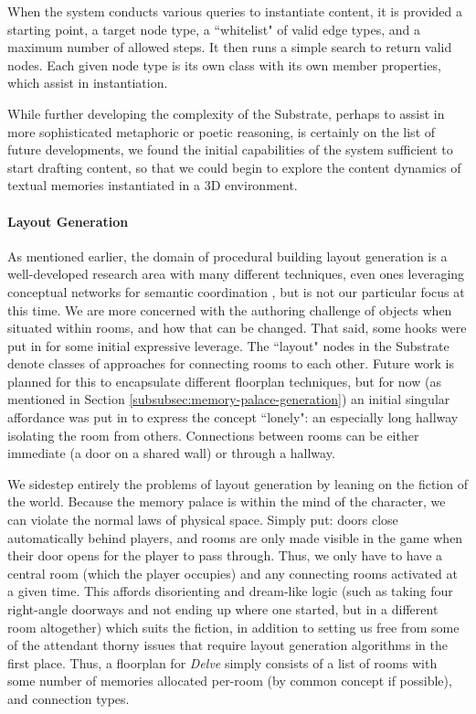 
When the system conducts various queries to instantiate content, it is provided a starting point, a target node type, a ``whitelist" of valid edge types, and a maximum number of allowed steps. It then runs a simple search to return valid nodes. Each given node type is its own class with its own member properties, which assist in instantiation.

While further developing the complexity of the Substrate, perhaps to assist in more sophisticated metaphoric or poetic reasoning, is certainly on the list of future developments, we found the initial capabilities of the system sufficient to start drafting content, so that we could begin to explore the content dynamics of textual memories instantiated in a 3D environment.

\paragraph{Layout Generation}\label{par:delve-implementation-layout-generation}

As mentioned earlier, the domain of procedural building layout generation is a well-developed research area with many different techniques, even ones leveraging conceptual networks for semantic coordination \cite{semantic_building}, but is not our particular focus at this time. We are more concerned with the authoring challenge of objects when situated within rooms, and how that can be changed. That said, some hooks were put in for some initial expressive leverage. The ``layout" nodes in the Substrate denote classes of approaches for connecting rooms to each other. Future work is planned for this to encapsulate different floorplan techniques, but for now (as mentioned in Section \ref{subsubsec:memory-palace-generation}) an initial singular affordance was put in to express the concept ``lonely": an especially long hallway isolating the room from others. Connections between rooms can be either immediate (a door on a shared wall) or through a hallway.

We sidestep entirely the problems of layout generation by leaning on the fiction of the world. Because the memory palace is within the mind of the character, we can violate the normal laws of physical space. Simply put: doors close automatically behind players, and rooms are only made visible in the game when their door opens for the player to pass through. Thus, we only have to have a central room (which the player occupies) and any connecting rooms activated at a given time. This affords disorienting and dream-like logic (such as taking four right-angle doorways and not ending up where one started, but in a different room altogether) which suits the fiction, in addition to setting us free from some of the attendant thorny issues that require layout generation algorithms in the first place. Thus, a floorplan for \textit{Delve} simply consists of a list of rooms with some number of memories allocated per-room (by common concept if possible), and connection types.

